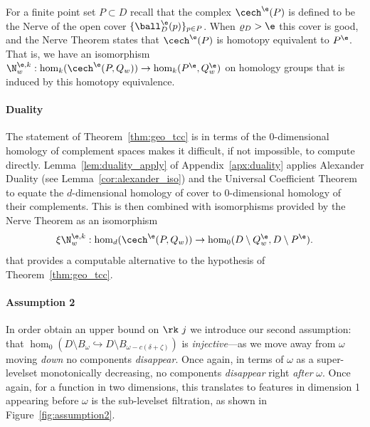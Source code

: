 
For a finite point set $P\subset D$ recall that the \Cech complex $\cech^\e(P)$ is defined to be the Nerve of the open cover $\{\ball_D^\e(p)\}_{p\in P}$.
When $\varrho_D > \e$ this cover is good, and the Nerve Theorem states that $\cech^\e(P)$ is homotopy equivalent to $P^\e$.
That is, we have an isomorphism $\N_w^{\e, k} : \hom_k(\cech^\e(P,Q_w))\to \hom_k(P^\e, Q_w^\e)$ on homology groups that is induced by this homotopy equivalence.%

\paragraph{Duality}

The statement of Theorem~\ref{thm:geo_tcc} is in terms of the $0$-dimensional homology of complement spaces makes it difficult, if not impossible, to compute directly.
Lemma~\ref{lem:duality_apply} of Appendix~\ref{apx:duality} applies Alexander Duality (see Lemma~\ref{cor:alexander_iso}) and the Universal Coefficient Theorem to equate the $d$-dimensional homology of cover to $0$-dimensional homology of their complements.
This is then combined with isomorphisms provided by the Nerve Theorem as an isomorphism
\[ \xi\N_w^{\e,k} : \hom_d(\cech^\e(P,Q_w))\to \hom_0(D\setminus Q_w^\e, D\setminus P^\e).\]
that provides a computable alternative to the hypothesis of Theorem~\ref{thm:geo_tcc}.

\paragraph{Assumption 2}

In order obtain an upper bound on $\rk~j$ we introduce our second assumption: that $\hom_0(D\setminus B_\omega\hookrightarrow D\setminus B_{\omega-c(\delta+\zeta)})$ is \emph{injective}---as we move away from $\omega$ moving \emph{down} no components \emph{disappear}.
Once again, in terms of $\omega$ as a super-levelset monotonically decreasing, no components \emph{disappear} right \emph{after} $\omega$.
Once again, for a function in two dimensions, this translates to features in dimension 1 appearing before $\omega$ is the sub-levelset filtration, as shown in Figure~\ref{fig:assumption2}.

